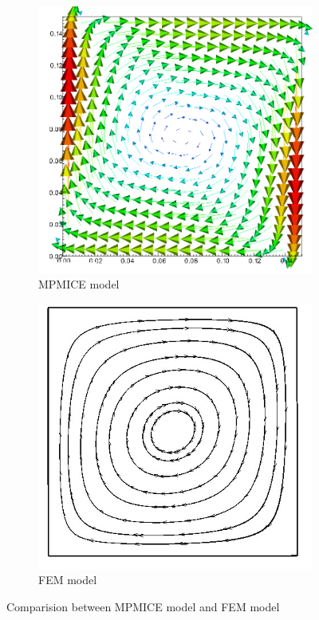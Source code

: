 \documentclass[preprint,12pt]{elsarticle}
\begin{document}
\begin{figure}
\center
\begin{subfigure}[c]{0.5\linewidth}
\includegraphics[width=\linewidth]{thermal.png}
\caption{MPMICE model}
\end {subfigure}\hfill    
\begin{subfigure}[d]{0.5\linewidth}
\includegraphics[width=\linewidth]{velocity_thermal-1.jpg}
\caption{FEM model \cite{Ali}}
\end {subfigure}
\caption{Comparision between MPMICE model and FEM model}
\label{fig:thermal}
\end {figure}
\end{document}
